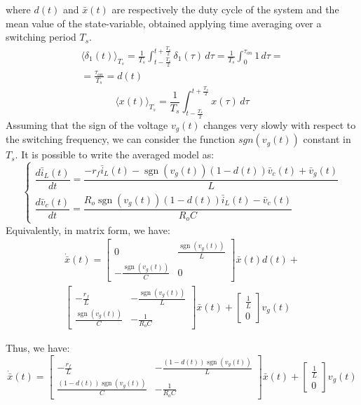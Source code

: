 \documentclass[DIV=calc, paper=a4, fontsize=11pt, twocolumn]{scrartcl}	 %
\begin{document}
where $d(t)$ and $\bar{x}(t)$ are respectively the duty cycle of the system and the mean value of the state-variable, obtained applying time averaging over a switching period $T_s$.
\begin{equation}
\begin{aligned}
\langle \delta_1(t) \rangle_{T_s} = \frac{1}{T_s} \int_{t - \frac{T_s}{2}}^{t + \frac{T_s}{2}} \delta_1(\tau) \, d\tau = \frac{1}{T_s} \int_{0}^{\tau_{on}} 1 \, d\tau = \\=\frac{\tau_{on}}{T_s} = d(t)
\end{aligned}
\end{equation}
\begin{equation}
\langle x(t) \rangle_{T_s} = \frac{1}{T_s} \int_{t - \frac{T_s}{2}}^{t + \frac{T_s}{2}} x(\tau) \, d\tau
\end{equation}
Assuming that the sign of the voltage $v_g(t)$ changes very slowly with respect to the switching frequency, we can consider the function $sgn(v_g(t))$ constant in $T_s$.
It is possible to write the averaged model as:
{\small
\begin{equation}\label{averaged_model}
\begin{cases} 
\dfrac{d \bar{i}_L(t)}{dt} = \dfrac{-r_f \bar{i}_L(t) - \operatorname{sgn}(v_g(t))(1-d(t))\bar{v}_c(t) + \bar{v}_g(t)}{L} \\[20pt]
\dfrac{d \bar{v}_c(t)}{dt} = \dfrac{R_o \operatorname{sgn}(v_g(t))(1-d(t)) \bar{i}_L(t) - \bar{v}_c(t)}{R_oC} 
\end{cases}
\end{equation}
}
Equivalently, in matrix form, we have:
\begin{gather}
\dot{\bar{x}}(t) = \begin{bmatrix} 0 & \frac{\operatorname{sgn}(v_g(t))}{L} \\ -\frac{\operatorname{sgn}(v_g(t))}{C} & 0 \end{bmatrix} \bar{x}(t) d(t) + \\ \begin{bmatrix} -\frac{r_f}{L} & -\frac{\operatorname{sgn}(v_g(t))}{L} \\ \frac{\operatorname{sgn}(v_g(t))}{C} & -\frac{1}{R_o C} \end{bmatrix} \bar{x}(t)
+\begin{bmatrix} \frac{1}{L} \\ 0 \end{bmatrix} v_g(t) 
\end{gather}

Thus, we have:
{\small
\begin{equation}
    \dot{\bar{x}}(t)= \begin{bmatrix} -\frac{r_f}{L} & -\frac{(1-d(t))\operatorname{sgn}(v_g(t))}{L} \\[6pt] \frac{(1-d(t))\operatorname{sgn}(v_g(t))}{C} & -\frac{1}{R_o C} \end{bmatrix} \bar{x}(t) + \begin{bmatrix} \frac{1}{L} \\ 0 \end{bmatrix} v_g(t) 
\end{equation}
}
\end{document}
